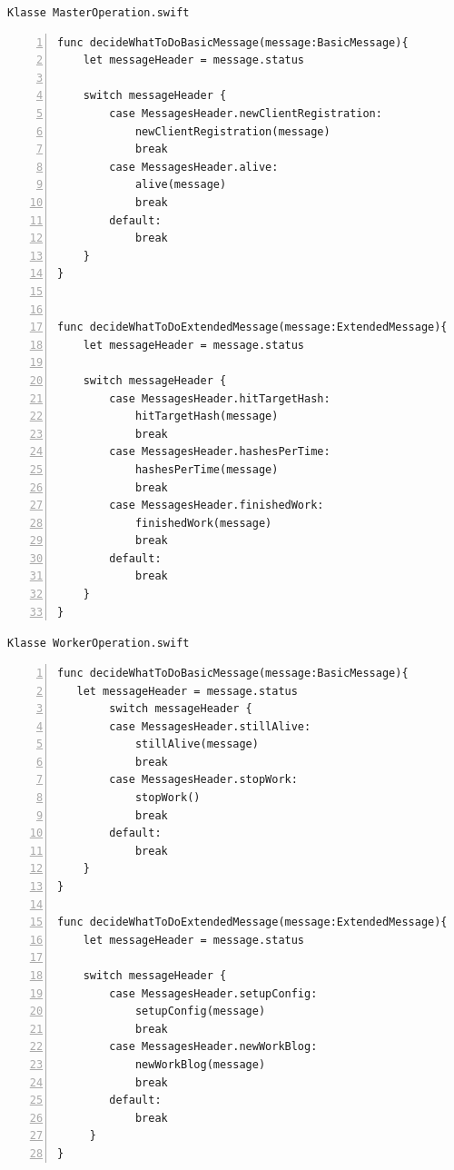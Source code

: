\texttt{Klasse MasterOperation.swift}
\begin{lstlisting}[basicstyle=\ttfamily,numbers=left,numberstyle=\footnotesize\ttfamily,backgroundcolor=\color{sourcegray}]
func decideWhatToDoBasicMessage(message:BasicMessage){
	let messageHeader = message.status
        
    switch messageHeader {
        case MessagesHeader.newClientRegistration:
            newClientRegistration(message)
            break
        case MessagesHeader.alive:
            alive(message)
            break
        default:
            break
    }
}


func decideWhatToDoExtendedMessage(message:ExtendedMessage){
    let messageHeader = message.status
        
    switch messageHeader {
        case MessagesHeader.hitTargetHash:
            hitTargetHash(message)
            break
        case MessagesHeader.hashesPerTime:
            hashesPerTime(message)
            break
        case MessagesHeader.finishedWork:
            finishedWork(message)
            break
        default:
            break
    }
}
\end{lstlisting}

\newpage

\texttt{Klasse WorkerOperation.swift}
\begin{lstlisting}[basicstyle=\ttfamily,numbers=left,numberstyle=\footnotesize\ttfamily,backgroundcolor=\color{sourcegray}]
func decideWhatToDoBasicMessage(message:BasicMessage){
   let messageHeader = message.status
        switch messageHeader {
        case MessagesHeader.stillAlive:
            stillAlive(message)
            break
        case MessagesHeader.stopWork:
            stopWork()
            break
        default:
            break
    }
}

func decideWhatToDoExtendedMessage(message:ExtendedMessage){
    let messageHeader = message.status
    
    switch messageHeader {
        case MessagesHeader.setupConfig:
            setupConfig(message)
            break
        case MessagesHeader.newWorkBlog:
            newWorkBlog(message)
            break
        default:
            break
     }
}
\end{lstlisting}

